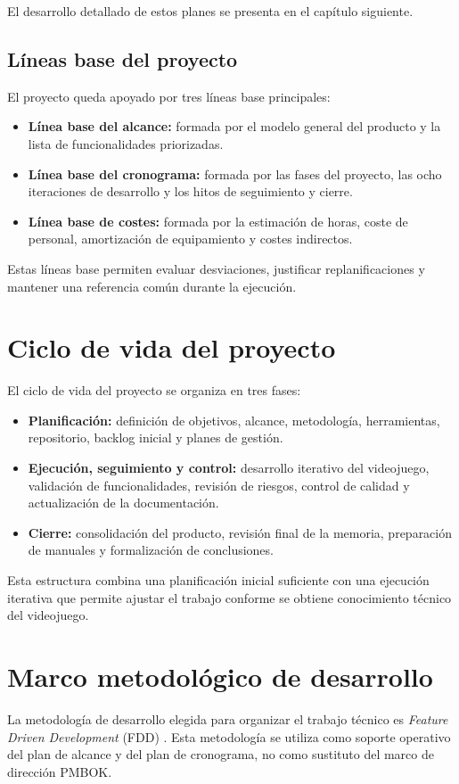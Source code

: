 El desarrollo detallado de estos planes se presenta en el capítulo siguiente.

\subsection{Líneas base del proyecto}
El proyecto queda apoyado por tres líneas base principales:

\begin{itemize}
    \item \textbf{Línea base del alcance:} formada por el modelo general del producto y la
    lista de funcionalidades priorizadas.
    \item \textbf{Línea base del cronograma:} formada por las fases del proyecto, las ocho
    iteraciones de desarrollo y los hitos de seguimiento y cierre.
    \item \textbf{Línea base de costes:} formada por la estimación de horas, coste de
    personal, amortización de equipamiento y costes indirectos.
\end{itemize}

Estas líneas base permiten evaluar desviaciones, justificar replanificaciones y mantener
una referencia común durante la ejecución.

\section{Ciclo de vida del proyecto}
El ciclo de vida del proyecto se organiza en tres fases:

\begin{itemize}
    \item \textbf{Planificación:} definición de objetivos, alcance, metodología,
    herramientas, repositorio, backlog inicial y planes de gestión.
    \item \textbf{Ejecución, seguimiento y control:} desarrollo iterativo del videojuego,
    validación de funcionalidades, revisión de riesgos, control de calidad y actualización
    de la documentación.
    \item \textbf{Cierre:} consolidación del producto, revisión final de la memoria,
    preparación de manuales y formalización de conclusiones.
\end{itemize}

Esta estructura combina una planificación inicial suficiente con una ejecución iterativa que
permite ajustar el trabajo conforme se obtiene conocimiento técnico del videojuego.

\section{Marco metodológico de desarrollo}
La metodología de desarrollo elegida para organizar el trabajo técnico es
\textit{Feature Driven Development} (FDD) \cite{palmer2002fdd}. Esta metodología se utiliza
como soporte operativo del plan de alcance y del plan de cronograma, no como sustituto del
marco de dirección PMBOK.

